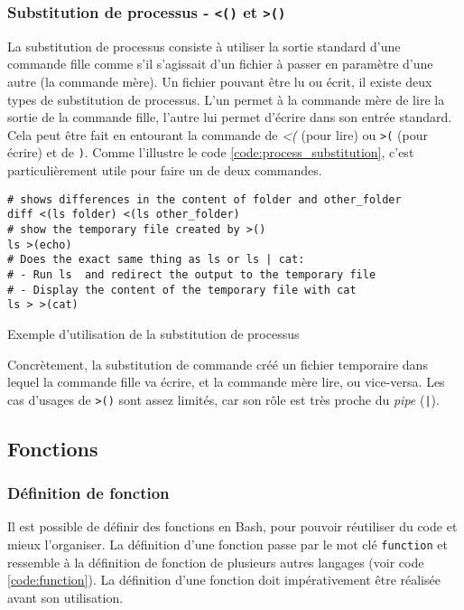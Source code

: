 \subsubsection{Substitution de processus - \texttt{<()} et \texttt{>()}}
La substitution de processus consiste à utiliser la sortie standard d'une commande fille comme s'il s'agissait d'un fichier à passer en paramètre d'une autre (la commande mère). Un fichier pouvant être lu ou écrit, il existe deux types de substitution de processus. L'un permet à la commande mère de lire la sortie de la commande fille, l'autre lui permet d'écrire dans son entrée standard.
Cela peut être fait en entourant la commande de \textit{<(} (pour lire) ou \texttt{>(} (pour écrire) et de \texttt{)}. Comme l'illustre le code \ref{code:process_substitution}, c'est particulièrement utile pour faire un  de deux commandes.

\begin{code}
\begin{verbatim}
# shows differences in the content of folder and other_folder
diff <(ls folder) <(ls other_folder)
# show the temporary file created by >()
ls >(echo)
# Does the exact same thing as ls or ls | cat:
# - Run ls  and redirect the output to the temporary file
# - Display the content of the temporary file with cat
ls > >(cat)
\end{verbatim}
\vspace{-5mm}
\caption{Exemple d'utilisation de la substitution de processus}
    \label{code:process_substitution}
\end{code}

Concrètement, la substitution de commande créé un fichier temporaire dans lequel la commande fille va écrire, et la commande mère lire, ou vice-versa. Les cas d'usages de \texttt{>()} sont assez limités, car son rôle est très proche du \textit{pipe} (\texttt{|}).

\newpage

\vspace{-5mm}
\subsection{Fonctions} \label{sec:functions}
\vspace{-7mm}

\subsubsection{Définition de fonction}
Il est possible de définir des fonctions en Bash, pour pouvoir réutiliser du code et mieux l'organiser. La définition d'une fonction passe par le mot clé \texttt{function} et ressemble à la définition de fonction de plusieurs autres langages (voir code \ref{code:function}). La définition d'une fonction doit impérativement être réalisée avant son utilisation.

